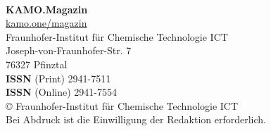 
\onecolumn
\pagestyle{empty}
\phantom{.}\\

\vfill

\textbf{KAMO.Magazin}\\
\href{https://kamo.one/magazin}{kamo.one/magazin}\\[10pt]

Fraunhofer-Institut für Chemische Technologie ICT\\
Joseph-von-Fraunhofer-Str. 7\\
76327 Pfinztal\\[10pt]


\textbf{ISSN} (Print) 2941-7511 \\
\textbf{ISSN} (Online) 2941-7554 \\[10pt]

© Fraunhofer-Institut für Chemische Technologie ICT\\
Bei Abdruck ist die Einwilligung der Redaktion erforderlich.

